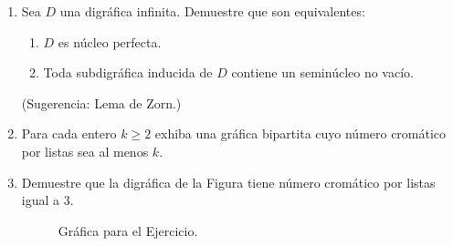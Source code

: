 \documentclass{article}
\begin{document}
\begin{enumerate}
  \item Sea $D$ una digr\'afica infinita.  Demuestre que son equivalentes:
    \begin{enumerate}
      \item $D$ es n\'ucleo perfecta.

      \item Toda subdigr\'afica inducida de $D$ contiene un semin\'ucleo no
        vac\'io.
    \end{enumerate}
    (Sugerencia: Lema de Zorn.)

  \item Para cada entero $k \ge 2$ exhiba una gr\'afica bipartita cuyo
    n\'umero crom\'atico por listas sea al menos $k$.

  \item Demuestre que la digr\'afica de la Figura tiene
    n\'umero crom\'atico por listas igual a $3$.
    \begin{figure}[ht!]
    \centering
    \caption{Gr\'afica para el Ejercicio.}
    \end{figure}
\end{enumerate}
\end{document}
